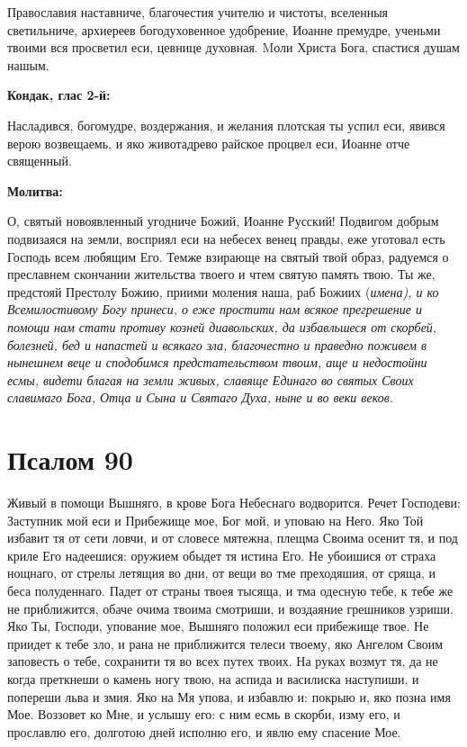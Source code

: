 Православия наставниче, благочестия учителю и чистоты, вселенныя светильниче, архиереев  богодуховенное удобрение, Иоанне  премудре, ученьми твоими вся просветил еси, цевнице духовная. Mоли Христа Бога, спастися душам нашым.


\medskip


\bfseries Кондак, глас 2-й:\normalfont{}


Насладився, богомудре, воздержания, и желания плотская ты успил еси, явився верою возвещаемь, и яко животадрево райское процвел еси, Иоанне  отче священный.


\medskip


\bfseries Молитва:\normalfont{}


О, святый новоявленный угодниче Божий, Иоанне Русский! Подвигом добрым подвизаяся на земли, восприял еси на небесех венец правды, еже уготовал есть Господь всем любящим Его. Темже взирающе на святый твой образ, радуемся о преславнем скончании жительства твоего и чтем святую память твою. Ты же, предстояй Престолу Божию, приими моления наша, раб Божиих (\itshape имена\normalfont{}), и ко Всемилостивому Богу принеси, о еже простити нам всякое прегрешение и помощи нам стати противу козней диавольских, да избавльшеся от скорбей, болезней, бед и напастей и всякаго зла, благочестно и праведно поживем в нынешнем веце и сподобимся предстательством твоим, аще и недостойни есмы, видети благая на земли живых, славяще Единаго во святых Своих славимаго Бога, Отца и Сына и Святаго Духа, ныне и во веки веков.


\section{Псалом 90}
 


Живый в помощи Вышняго, в крове Бога Небеснаго водворится. Речет Господеви: Заступник мой еси и Прибежище мое, Бог мой, и уповаю на Него. Яко Той избавит тя от сети ловчи, и от словесе мятежна, плещма Своима осенит тя, и под криле Его надеешися: оружием обыдет тя истина Его. Не убоишися от страха нощнаго, от стрелы летящия во дни, от вещи во тме преходяшия, от сряща, и беса полуденнаго. Падет от страны твоея тысяща, и тма одесную тебе, к тебе же не приближится, обаче очима твоима смотриши, и воздаяние грешников узриши. Яко Ты, Господи, упование мое, Вышняго положил еси прибежище твое. Не приидет к тебе зло, и рана не приближится телеси твоему, яко Ангелом Своим заповесть о тебе, сохранити тя во всех путех твоих. На руках возмут тя, да не когда преткнеши о камень ногу твою, на аспида и василиска наступиши, и попереши льва и змия. Яко на Мя упова, и избавлю и: покрыю и, яко позна имя Мое. Воззовет ко Мне, и услышу его: с ним есмь в скорби, изму его, и прославлю его, долготою дней исполню его, и явлю ему спасение Мое.


